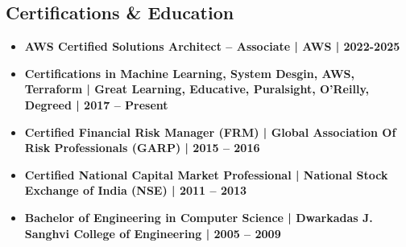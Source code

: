 \vspace{-1em}
\subsection*{\color{CarianBlue} \Large Certifications \& Education \crulefill{1pt}}

\begin{itemize}[leftmargin=1em,noitemsep]
    \item \textbf{AWS Certified Solutions Architect – Associate | AWS | 2022-2025}
    \item \textbf{Certifications in Machine Learning, System Desgin, AWS, Terraform | Great Learning, Educative, Puralsight, O’Reilly, Degreed | 2017 – Present}
    \item \textbf{Certified Financial Risk Manager (FRM) | Global Association Of Risk Professionals (GARP) | 2015 – 2016}
    \item \textbf{Certified National Capital Market Professional | National Stock Exchange of India (NSE) | 2011 – 2013}
    \item \textbf{Bachelor of Engineering in Computer Science | Dwarkadas J. Sanghvi College of Engineering | 2005 – 2009}
\end{itemize}

